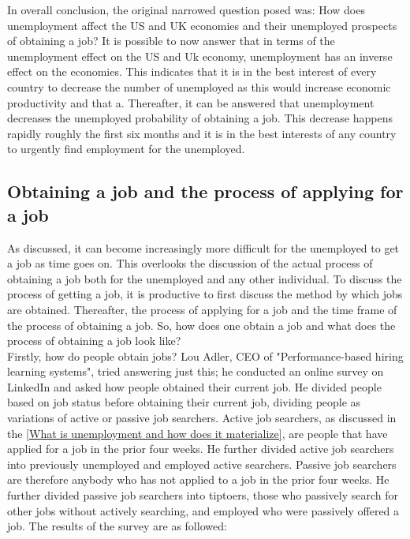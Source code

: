 In overall conclusion, the original narrowed question posed was:
How does unemployment affect the US and UK economies and their unemployed prospects of obtaining a job?
It is possible to now answer that in terms of the unemployment effect on the US and Uk economy, unemployment has an inverse effect on the economies.
This indicates that it is in the best interest of every country to decrease the number of unemployed as this would increase economic productivity and that a.
Thereafter, it can be answered that unemployment decreases the unemployed probability of obtaining a job.
This decrease happens rapidly roughly the first six months and it is in the best interests of any country to urgently find employment for the unemployed. \\

\subsection{Obtaining a job and the process of applying for a job}
As discussed, it can become increasingly more difficult for the unemployed to get a job as time goes on.
This overlooks the discussion of the actual process of obtaining a job both for the unemployed and any other individual.
To discuss the process of getting a job, it is productive to first discuss the method by which jobs are obtained.
Thereafter, the process of applying for a job and the time frame of the process of obtaining a job.
So, how does one obtain a job and what does the process of obtaining a job look like? \\

Firstly, how do people obtain jobs?
Lou Adler, CEO of "Performance-based hiring learning systems", tried answering just this; he conducted an online survey on LinkedIn and asked how people obtained their current job.
He divided people based on job status before obtaining their current job, dividing people as variations of active or passive job searchers.
Active job searchers, as discussed in the \ref{What is unemployment and how does it materialize}, are people that have applied for a job in the prior four weeks.
He further divided active job searchers into previously unemployed and employed active searchers.
Passive job searchers are therefore anybody who has not applied to a job in the prior four weeks.
He further divided passive job searchers into tiptoers, those who passively search for other jobs without actively searching, and employed who were passively offered a job.
The results of the survey are as followed: \\

